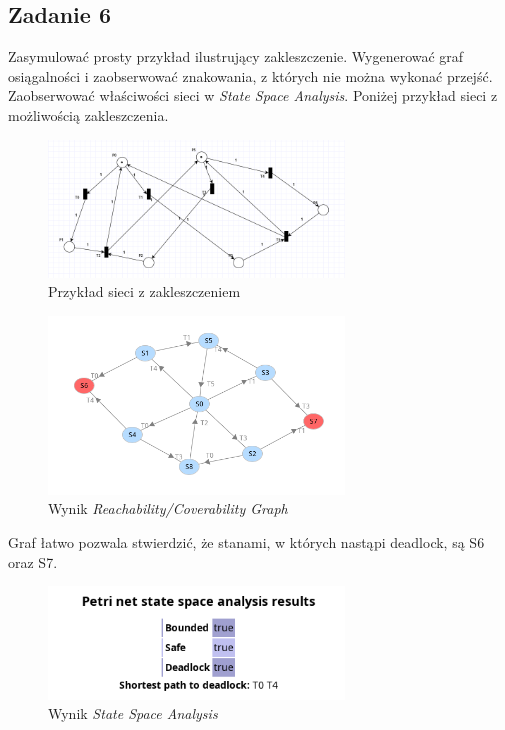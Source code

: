 \documentclass{article}
\begin{document}
\subsection{Zadanie 6}
Zasymulować prosty przykład ilustrujący zakleszczenie. Wygenerować graf osiągalności i zaobserwować
znakowania, z których nie można wykonać przejść. Zaobserwować właściwości sieci w \textit{State Space Analysis}.
Poniżej przykład sieci z możliwością zakleszczenia.

\begin{figure}[H]
    \centering
    \includegraphics[width=0.7\textwidth]{net_6.png}
    \caption{Przykład sieci z zakleszczeniem}
\end{figure}

\begin{figure}[H]
    \centering
    \includegraphics[width=0.7\textwidth]{graph_6.png}
    \caption{Wynik \textit{Reachability/Coverability Graph}}
\end{figure}

Graf łatwo pozwala stwierdzić, że stanami, w których nastąpi deadlock, są S6 oraz S7.

\begin{figure}[H]
    \centering
    \includegraphics[width=0.7\textwidth]{analysis_6.png}
    \caption{Wynik \textit{State Space Analysis}}
\end{figure}
\end{document}
